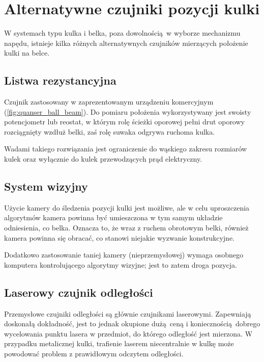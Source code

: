 \chapter{Alternatywne czujniki pozycji kulki}
\label{appB_alternatywne_czujniki_pozycji_kulki}

W systemach typu kulka i belka, poza dowolnością w wyborze mechanizmu napędu, istnieje kilka różnych alternatywnych czujników mierzących położenie kulki na belce.

\section{Listwa rezystancyjna}

Czujnik zastosowany w zaprezentowanym urządzeniu komercyjnym (\cref{fig:quanser_ball_beam}). Do pomiaru położenia wykorzystywany jest swoisty potencjometr lub reostat, w którym rolę ścieżki oporowej pełni drut oporowy rozciągnięty wzdłuż belki, zaś rolę suwaka odgrywa ruchoma kulka.

Wadami takiego rozwiązania jest ograniczenie do wąskiego zakresu rozmiarów kulek oraz wyłącznie do kulek przewodzących prąd elektryczny.

\section{System wizyjny}

Użycie kamery do śledzenia pozycji kulki jest możliwe, ale w celu uproszczenia algorytmów kamera powinna być umieszczona w tym samym układzie odniesienia, co belka. Oznacza to, że wraz z ruchem obrotowym belki, również kamera powinna się obracać, co stanowi niejakie wyzwanie konstrukcyjne.

Dodatkowo zastosowanie taniej kamery (nieprzemysłowej) wymaga osobnego komputera kontrolującego algorytmy wizyjne; jest to zatem droga pozycja.

\section{Laserowy czujnik odległości}

Przemysłowe czujniki odległości są głównie czujnikami laserowymi. Zapewniają doskonałą dokładność, jest to jednak okupione dużą ceną i koniecznością dobrego wycelowania punktu lasera w przedmiot, do którego odległość jest mierzona. W przypadku metalicznej kulki, trafienie laserem niecentralnie w kulkę może powodować problem z prawidłowym odczytem odległości.

